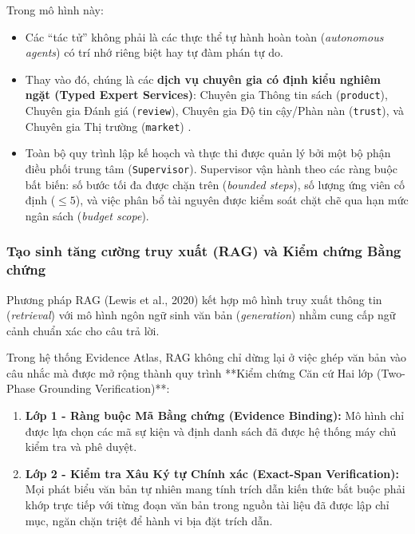Trong mô hình này:
\begin{itemize}
    \item Các ``tác tử'' không phải là các thực thể tự hành hoàn toàn (\textit{autonomous agents}) có trí nhớ riêng biệt hay tự đàm phán tự do.
    \item Thay vào đó, chúng là các \textbf{dịch vụ chuyên gia có định kiểu nghiêm ngặt (Typed Expert Services)}: Chuyên gia Thông tin sách (\texttt{product}), Chuyên gia Đánh giá (\texttt{review}), Chuyên gia Độ tin cậy/Phàn nàn (\texttt{trust}), và Chuyên gia Thị trường (\texttt{market}) .
    \item Toàn bộ quy trình lập kế hoạch và thực thi được quản lý bởi một bộ phận điều phối trung tâm (\texttt{Supervisor}). Supervisor vận hành theo các ràng buộc bất biến: số bước tối đa được chặn trên (\textit{bounded steps}), số lượng ứng viên cố định ($\le 5$), và việc phân bổ tài nguyên được kiểm soát chặt chẽ qua hạn mức ngân sách (\textit{budget scope}).
\end{itemize}

\subsubsection{Tạo sinh tăng cường truy xuất (RAG) và Kiểm chứng Bằng chứng}
Phương pháp RAG (Lewis et al., 2020)  kết hợp mô hình truy xuất thông tin (\textit{retrieval}) với mô hình ngôn ngữ sinh văn bản (\textit{generation}) nhằm cung cấp ngữ cảnh chuẩn xác cho câu trả lời. 

Trong hệ thống Evidence Atlas, RAG không chỉ dừng lại ở việc ghép văn bản vào câu nhắc mà được mở rộng thành quy trình **Kiểm chứng Căn cứ Hai lớp (Two-Phase Grounding Verification)**:
\begin{enumerate}
    \item \textbf{Lớp 1 - Ràng buộc Mã Bằng chứng (Evidence Binding):} Mô hình chỉ được lựa chọn các mã sự kiện và định danh sách đã được hệ thống máy chủ kiểm tra và phê duyệt.
    \item \textbf{Lớp 2 - Kiểm tra Xâu Ký tự Chính xác (Exact-Span Verification):} Mọi phát biểu văn bản tự nhiên mang tính trích dẫn kiến thức bắt buộc phải khớp trực tiếp với từng đoạn văn bản trong nguồn tài liệu đã được lập chỉ mục, ngăn chặn triệt để hành vi bịa đặt trích dẫn.
\end{enumerate}
